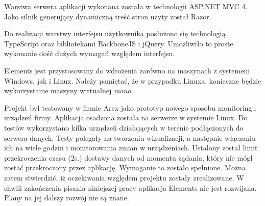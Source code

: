 Warstwa serwera aplikacji wykonana została w technologii ASP.NET MVC 4. Jako silnik generujący dynamiczną treść stron użyty został Razor. 

Do realizacji warstwy interfejsu użytkownika posłużono się technologią TypeScript oraz bibliotekami BackboneJS i jQuery. Umożliwiło to proste wykonanie dość dużych wymagań względem interfejsu.

Elements jest przystosowany do wdrożenia zarówno na maszynach z systemem Windows, jak i Linux. Należy pamiętać, że w przypadku Linuxa, konieczne będzie wykorzystanie maszyny wirtualnej \textit{mono}.

Projekt był testowany w firmie Arex jako prototyp nowego sposobu monitoringu urządzeń firmy. Aplikacja osadzona została na serwerze w systemie Linux. Do testów wykorzystano kilka urządzeń działających w terenie podłączonych do serwera danych. Testy polegały na tworzeniu wizualizacji, a następnie włączaniu ich na wiele godzin i monitorowania zmian w urządzeniach. Ustalony został limit przekroczenia czasu (2s.) dostawy danych od momentu żądania, który nie mógł zostać przekroczony przez aplikację. Wymaganie to zostało spełnione. Można zatem stwierdzić, iż oczekiwania względem projektu zostały zrealizowane. W chwili zakończenia pisania niniejszej pracy aplikacja Elements nie jest rozwijana. Plany na jej dalszy rozwój nie są znane.


